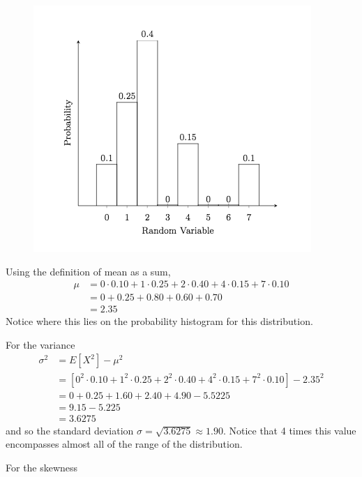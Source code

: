 \documentclass[10pt,]{book}
\numberwithin{equation}{section}
\begin{document}
 \begin{figure}\centering\includegraphics[width=1\linewidth]{images/DiscreteHistogramExample.png}
\end{figure}%
\par
\hypertarget{p-736}{}%
Using the definition of mean as a sum,%
\begin{align*}
\mu & = 0 \cdot 0.10 + 1 \cdot 0.25 + 2 \cdot 0.40 + 4 \cdot 0.15 + 7 \cdot 0.10\\
& = 0 + 0.25 + 0.80 + 0.60 + 0.70\\
& = 2.35
\end{align*}
Notice where this lies on the probability histogram for this distribution.%
\par
\hypertarget{p-737}{}%
For the variance%
\begin{align*}
\sigma^2 & = E[X^2] - \mu^2\\
& = \left [ 0^2 \cdot 0.10 + 1^2 \cdot 0.25 + 2^2 \cdot 0.40 + 4^2 \cdot 0.15 + 7^2 \cdot 0.10 \right ] - 2.35^2\\
& = 0 + 0.25 + 1.60 + 2.40 + 4.90 - 5.5225\\
& = 9.15 - 5.225\\
& = 3.6275 
\end{align*}
and so the standard deviation \(\sigma = \sqrt{3.6275} \approx 1.90\). Notice that 4 times this value encompasses almost all of the range of the distribution.%
\par
\hypertarget{p-738}{}%
For the skewness%
\end{document}
